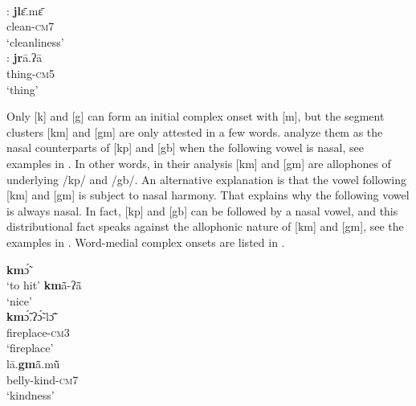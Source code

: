 \documentclass[output=paper]{langscibook}
\begin{document}
\begin{exe}
\begin{multicols}{2}
\begin{xlisti}
                {} {} \\
        \ex \glll [jl]:         \textbf{jl}ɛ̄.mɛ̄ \\
            {}      clean-\textsc{cm}7\\
            {} `cleanliness'\\
        \ex \glll [jr]:       \textbf{jr}ā.ʔā\\
            {}              thing-\textsc{cm}5\\
            {}              `thing'\\
        \end{xlisti}
    \end{multicols}
\end{exe}


Only [k] and [g] can form an initial complex onset with [m], but the segment clusters [km] and [gm] are only attested in a few words. \citet{Herault1973} analyze them as the nasal counterparts of [kp] and [gb] when the following vowel is nasal, see examples in . In other words, in their analysis [km] and [gm] are allophones of underlying /kp/ and /gb/. An alternative explanation is that the vowel following [km] and [gm] is subject to nasal harmony. That explains why the following vowel is always nasal. In fact, [kp] and [gb] can be followed by a nasal vowel, and this distributional fact speaks against the allophonic nature of [km] and [gm], see the examples in . Word-medial complex onsets are listed in .


\begin{exe}
    \ex \label{ex:traore:velarPlusNasalComplexOnset:13}
    \begin{multicols}{2}
    \begin{xlist}
        \ex \textbf{km}ɔ̃́ \\
            `to hit'
        \ex \textbf{km}ã̄-ʔã̄  \\
            `nice'\\
        \ex \gll \textbf{km}ɔ̃́.ʔɔ̃́-lɔ̃̄ \\
            fireplace-\textsc{cm}3\\
            \trans `fireplace'\\
        \ex \gll lā.\textbf{gm}ã̄.mũ̄  \\
            belly-kind-\textsc{cm}7\\
            \trans `kindness'\\
    \end{xlist}
    \end{multicols}
\end{exe} 
\end{document}
